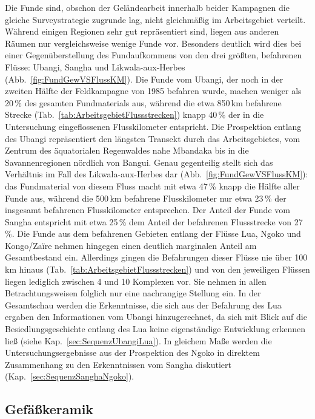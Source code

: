 Die Funde sind, obschon der Geländearbeit innerhalb beider Kampagnen die gleiche Surveystrategie zugrunde lag, nicht gleichmäßig im Arbeitsgebiet verteilt. Während einigen Regionen sehr gut repräsentiert sind, liegen aus anderen Räumen nur vergleichsweise wenige Funde vor. Besonders deutlich wird dies bei einer Gegenüberstellung des Fundaufkommens von den drei größten, befahrenen Flüsse: Ubangi, Sangha und Likwala-aux-Herbes (Abb.~\ref{fig:FundGewVSFlussKM}). Die Funde vom Ubangi, der noch in der zweiten Hälfte der Feldkampagne von 1985 befahren wurde, machen weniger als 20\,\% des gesamten Fundmaterials aus, während die etwa 850\,km befahrene Strecke (Tab.~\ref{tab:ArbeitsgebietFlussstrecken}) knapp 40\,\% der in die Untersuchung eingeflossenen Flusskilometer entspricht. Die Prospektion entlang des Ubangi repräsentiert den längsten Transekt durch das Arbeitsgebietes, vom Zentrum des äquatorialen Regenwaldes nahe Mbandaka bis in die Savannenregionen nördlich von Bangui. Genau gegenteilig stellt sich das Verhältnis im Fall des Likwala-aux-Herbes dar (Abb.~\ref{fig:FundGewVSFlussKM}): das Fundmaterial von diesem Fluss macht mit etwa 47\,\% knapp die Hälfte aller Funde aus, während die 500\,km befahrene Flusskilometer nur etwa 23\,\% der insgesamt befahrenen Flusskilometer entsprechen. Der Anteil der Funde vom Sangha entspricht mit etwa 25\,\% dem Anteil der befahrenen Flussstrecke von 27\,\%. Die Funde aus dem befahrenen Gebieten entlang der Flüsse Lua, Ngoko und Kongo/Zaïre nehmen hingegen einen deutlich marginalen Anteil am Gesamtbestand ein. Allerdings gingen die Befahrungen dieser Flüsse nie über 100\,km hinaus (Tab.~\ref{tab:ArbeitsgebietFlussstrecken}) und von den jeweiligen Flüssen liegen lediglich zwischen 4 und 10 Komplexen vor. Sie nehmen in allen Betrachtungsweisen folglich nur eine nachrangige Stellung ein. In der Gesamtschau werden die Erkenntnisse, die sich aus der Befahrung des Lua ergaben den Informationen vom Ubangi hinzugerechnet, da sich mit Blick auf die Besiedlungsgeschichte entlang des Lua keine eigenständige Entwicklung erkennen ließ (siehe Kap.~\ref{sec:SequenzUbangiLua}). In gleichem Maße werden die Untersuchungsergebnisse aus der Prospektion des Ngoko in direktem Zusammenhang zu den Erkenntnissen vom Sangha diskutiert (Kap.~\ref{sec:SequenzSanghaNgoko}).


\subsection{Gefäßkeramik}\label{sec:GefKeramik}

